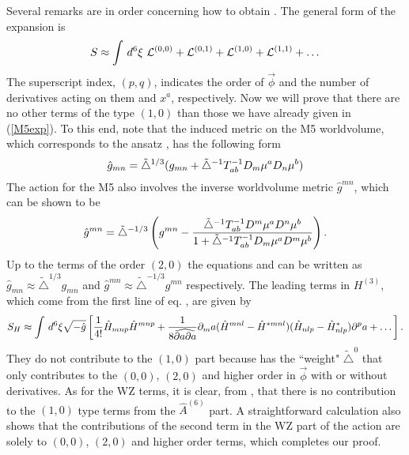 \documentclass[a4paper,11pt]{article}
\begin{document}
Several remarks are in order concerning how to obtain . The general form of
the expansion is
\begin{equation}\plabel{expgen}
S\approx \int\, d^6\xi~ {\cal L}^{(0,0)}+{\cal L}^{(0,1)}+{\cal
L}^{(1,0)}+{\cal L}^{(1,1)} +\dots
\end{equation}
The superscript index, $(p,q)$, indicates the order of
$\vec{\phi}$ and the number of derivatives acting on them and
$x^a$, respectively. Now we will prove that there are no other
terms of the type $(1,0)$ than those we have already given in
(\ref{M5exp}). To this end, note that the induced metric on the M5
worldvolume, which corresponds to the ansatz , has the
following form
\begin{equation}\plabel{indg}
\hat{g}_{mn}=\tilde{\triangle}^{1/3}(g_{mn}+\tilde{\triangle}^{-1}T^{-1}_{ab}D_m \mu^a
D_n \mu^b)
\end{equation}
The action for the M5 also involves the inverse worldvolume
metric $\hat{g}^{mn}$, which can be shown to be
\begin{equation}\plabel{invg}
\hat{g}^{mn}=\tilde{\triangle}^{-1/3}\left( g^{mn}-{\tilde{\triangle}^{-1}
T^{-1}_{ab}D^{m}\mu^a D^n\mu^b \over 1+\tilde{\triangle}^{-1}T^{-1}_{ab}D_m \mu^a
D^m \mu^b}\right).
\end{equation}
Up to the terms of the order $(2,0)$ the equations  and
 can be written as $\hat{g}_{mn}\approx
\tilde{\triangle}^{1/3}g_{mn}$ and $\hat{g}^{mn}\approx
\tilde{\triangle}^{-1/3} g^{mn}$ respectively. The leading terms
in $H^{(3)}$, which come from the first line of eq. , are
given by \cite{bns}
\begin{equation}\plabel{Hexp}
S_{H}\approx \int\, d^6\xi \sqrt{-\hat{g}}\left[{1\over 4!}\hat{H}_{mnp}\hat{H}^{mnp}+
{1\over 8 \widehat{{\partial a}{\partial a}}}\partial_m a (\hat{H}^{mnl}-\hat{H}^{*mnl})
(\hat{H}_{nlp}-\hat{H}^{*}_{nlp})\partial^p a+\dots \right].
\end{equation}
They do not contribute to the $(1,0)$ part because  has
the ``weight" $\tilde{\triangle}^{0}$ that only contributes to the
$(0,0)$, $(2,0)$ and higher order in $\vec{\phi}$ with or without
derivatives. As for the WZ terms, it is clear, from , that
there is no contribution to the $(1,0)$ type terms from the ${\hat
A}^{(6)}$ part. A straightforward calculation also shows that the
contributions of the second term in the WZ part of the action are
solely to $(0,0)$, $(2,0)$ and higher order terms, which completes
our proof.
\end{document}
